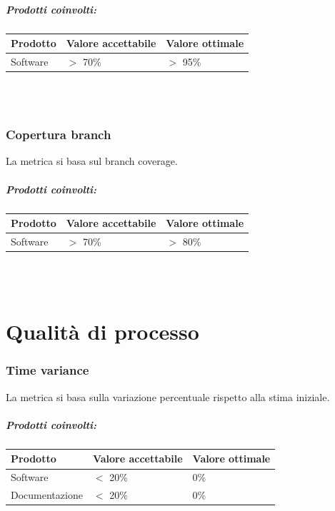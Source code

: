 \documentclass[a4paper, 12pt]{article}
\begin{document}
\subparagraph{Prodotti coinvolti:}
\begin{center}
	\begin{tabularx}{\textwidth}{|X|X|X|}
		\hline
		\textbf{Prodotto} & \textbf{Valore accettabile } & \textbf{Valore ottimale } \\
		\hline
		Software          & $>$ 70\%                     & $>$ 95\%                  \\
		\hline
	\end{tabularx}\\[8pt]
	\mbox{}\\
\end{center}
\subsubsection{Copertura branch}
La metrica si basa sul branch coverage.

\subparagraph{Prodotti coinvolti:}
\begin{center}
	\begin{tabularx}{\textwidth}{|X|X|X|}
		\hline
		\textbf{Prodotto} & \textbf{Valore accettabile } & \textbf{Valore ottimale } \\
		\hline
		Software          & $>$ 70\%                     & $>$ 80\%                  \\
		\hline
	\end{tabularx}\\[8pt]
	\mbox{}\\
\end{center}

\newpage
\section{Qualità di processo}
\subsubsection{Time variance}
La metrica si basa sulla variazione percentuale rispetto alla stima iniziale.

\subparagraph{Prodotti coinvolti:}
\begin{center}
	\begin{tabularx}{\textwidth}{|X|X|X|}
		\hline
		\textbf{Prodotto} & \textbf{Valore accettabile } & \textbf{Valore ottimale } \\
		\hline
		Software          & $<$ 20\%                     & 0\%                       \\
		\hline
		Documentazione    & $<$ 20\%                     & 0\%                       \\
		\hline
	\end{tabularx}\\[8pt]
	\mbox{}\\
\end{center}
\end{document}
